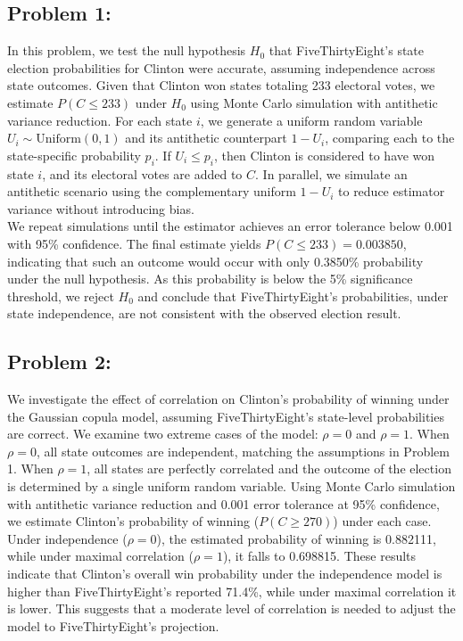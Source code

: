\documentclass{report}
\begin{document}
\subsection*{Problem 1:}
In this problem, we test the null hypothesis $H_0$ that FiveThirtyEight's state election probabilities for Clinton were accurate, assuming independence across state outcomes. Given that Clinton won states totaling 233 electoral votes, we estimate $P(C \leq 233)$ under $H_0$ using Monte Carlo simulation with antithetic variance reduction. For each state $i$, we generate a uniform random variable $U_i \sim \text{Uniform}(0,1)$ and its antithetic counterpart $1 - U_i$, comparing each to the state-specific probability $p_i$. If $U_i \leq p_i$, then Clinton is considered to have won state $i$, and its electoral votes are added to $C$. In parallel, we simulate an antithetic scenario using the complementary uniform $1 - U_i$ to reduce estimator variance without introducing bias. \\

We repeat simulations until the estimator achieves an error tolerance below 0.001 with 95\% confidence. The final estimate yields $P(C\leq 233) = 0.003850$, indicating that such an outcome would occur with only 0.3850\% probability under the null hypothesis. As this probability is below the 5\% significance threshold, we reject $H_0$ and conclude that FiveThirtyEight's probabilities, under state independence, are not consistent with the observed election result.

\subsection*{Problem 2:}
We investigate the effect of correlation on Clinton's probability of winning under the Gaussian copula model, assuming FiveThirtyEight's state-level probabilities are correct. We examine two extreme cases of the model: $\rho = 0$ and $\rho = 1$. When $\rho = 0$, all state outcomes are independent, matching the assumptions in Problem 1. When $\rho = 1$, all states are perfectly correlated and the outcome of the election is determined by a single uniform random variable. Using Monte Carlo simulation with antithetic variance reduction and 0.001 error tolerance at 95\% confidence, we estimate Clinton's probability of winning ($P(C\geq 270)$) under each case. \\

Under independence ($\rho = 0$), the estimated probability of winning is 0.882111, while under maximal correlation ($\rho = 1$), it falls to 0.698815. These results indicate that Clinton's overall win probability under the independence model is higher than FiveThirtyEight's reported 71.4\%, while under maximal correlation it is lower. This suggests that a moderate level of correlation is needed to adjust the model to FiveThirtyEight's projection.
\end{document}
